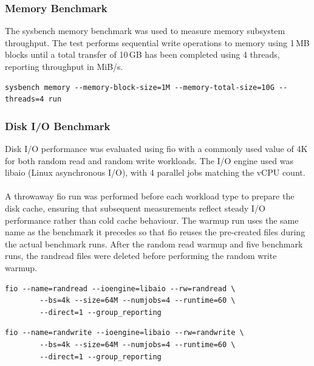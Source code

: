 \documentclass[a4paper, 12pt]{article}
\theoremstyle{plain}
\theoremstyle{definition}
\theoremstyle{remark}
\begin{document}
    \subsubsection{Memory Benchmark}

    The sysbench memory benchmark was used to measure memory subsystem throughput. 
    The test performs sequential write operations to memory using 1\,MB blocks until 
    a total transfer of 10\,GB has been completed using 4 threads, reporting 
    throughput in MiB/s.

    \begin{lstlisting}[caption={sysbench memory benchmark command.}]
    sysbench memory --memory-block-size=1M --memory-total-size=10G --threads=4 run
    \end{lstlisting}

    \subsubsection{Disk I/O Benchmark}

    Disk I/O performance was evaluated using fio with a commonly used value of 4K
    for both random read and random write workloads. The I/O engine used was libaio 
    (Linux asynchronous I/O), with 4 parallel jobs matching the vCPU count.\\
    \\
    \noindent A throwaway fio run was performed before each workload type to prepare
    the disk cache, ensuring that subsequent measurements reflect steady I/O
    performance rather than cold cache behaviour. The warmup run uses the same
    name as the benchmark it precedes so that fio reuses the pre-created files
    during the actual benchmark runs. After the random read warmup and five
    benchmark runs, the randread files were deleted before performing the
    random write warmup. \\

    \begin{lstlisting}[caption={fio random read benchmark command.}]
    fio --name=randread --ioengine=libaio --rw=randread \
        --bs=4k --size=64M --numjobs=4 --runtime=60 \
        --direct=1 --group_reporting
    \end{lstlisting}

    \begin{lstlisting}[caption={fio random write benchmark command.}]
    fio --name=randwrite --ioengine=libaio --rw=randwrite \
        --bs=4k --size=64M --numjobs=4 --runtime=60 \
        --direct=1 --group_reporting
    \end{lstlisting}
\end{document}
